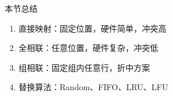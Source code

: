 \documentclass[10pt, aspectratio=169]{beamer}
\begin{document}
\begin{frame}{本节总结}
    \begin{enumerate}
        \item 直接映射：固定位置，硬件简单，冲突高
        \item 全相联：任意位置，硬件复杂，冲突低
        \item 组相联：固定组内任意行，折中方案
        \item 替换算法：Random、FIFO、LRU、LFU
    \end{enumerate}
\end{frame}
\end{document}
